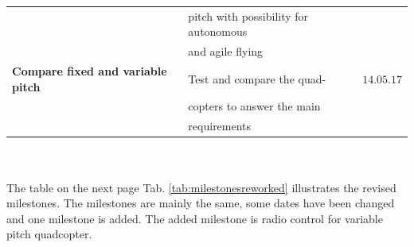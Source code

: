 \begin{table}[h]
\begin{tabular}{llc}
                            & pitch with possibility for autonomous & \\
                            & and agile flying & \\\rowcolor{gainsboro}
\textbf{Compare fixed and variable pitch}  & Test and compare the quad- & $14.05.17$ \\\rowcolor{gainsboro}
                                           & copters to answer the main & \\\rowcolor{gainsboro}
                                           & requirements & 
\end{tabular}                                                               
\end{table}
\\\\

The table on the next page Tab. \ref{tab:milestonesreworked} illustrates the revised milestones. The milestones are mainly the same, some dates have been changed and one milestone is added. The added milestone is radio control for variable pitch quadcopter.

